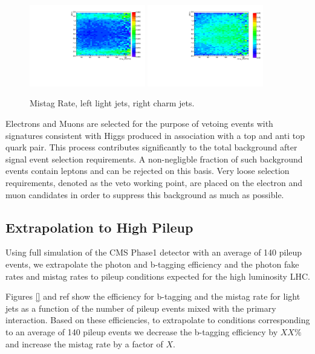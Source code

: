 \documentclass{cmspaper}
\begin{document}
\begin{figure}[h]
  \centering
  \includegraphics[width=0.45\textwidth]{figures/EfficiencyPtEta_LightJetMistag.pdf}
  \includegraphics[width=0.45\textwidth]{figures/EfficiencyPtEta_CharmJetMistag.pdf}
  \caption{Mistag Rate, left light jets, right charm jets.}
  \label{fig:mistagRate}
\end{figure}


Electrons and Muons are selected for the purpose of vetoing events with signatures consistent
with Higgs produced in association with a top and anti top quark pair. This process contributes
significantly to the total background after signal event selection requirements. A non-negligble
fraction of such background events contain leptons and can be rejected on this basis. Very loose
selection requirements, denoted as the veto working point, are placed on the 
electron and muon candidates in order to suppress this background as much as possible. 

\subsection{Extrapolation to High Pileup}
\label{sec:HighPileupExtrapolation}

Using full simulation of the CMS Phase1 detector with an average of 140 pileup events, we extrapolate
the photon and b-tagging efficiency and the photon fake rates and mistag rates to pileup conditions
expected for the high luminosity LHC. 

Figures \ref{} and ref{} show the efficiency for b-tagging and the mistag rate for light jets 
as a function of the number of pileup events mixed with the primary interaction. Based on these efficiencies, 
to extrapolate to conditions corresponding to an average of 140 pileup events we decrease
the b-tagging efficiency by $XX\%$ and increase the mistag rate by a factor of $X$. 
\end{document}
